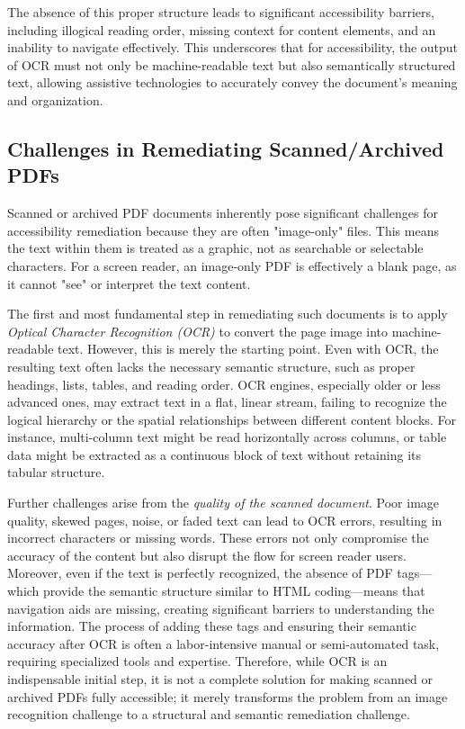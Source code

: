 The absence of this proper structure leads to significant accessibility barriers, including illogical reading order, missing context for content elements, and an inability to navigate effectively. \cite{UWDocInfo,DevToPDFStructure} This underscores that for accessibility, the output of OCR must not only be machine-readable text but also semantically structured text, allowing assistive technologies to accurately convey the document's meaning and organization.

\subsection{Challenges in Remediating Scanned/Archived PDFs}

Scanned or archived PDF documents inherently pose significant challenges for accessibility remediation because they are often "image-only" files. This means the text within them is treated as a graphic, not as searchable or selectable characters. \cite{AdobeOCR, AWSOCR, UWDocInfo} For a screen reader, an image-only PDF is effectively a blank page, as it cannot "see" or interpret the text content.

The first and most fundamental step in remediating such documents is to apply \emph{Optical Character Recognition (OCR)} to convert the page image into machine-readable text. \cite{UWDocInfo} However, this is merely the starting point. Even with OCR, the resulting text often lacks the necessary semantic structure, such as proper headings, lists, tables, and reading order. \cite{UWDocInfo} OCR engines, especially older or less advanced ones, may extract text in a flat, linear stream, failing to recognize the logical hierarchy or the spatial relationships between different content blocks. For instance, multi-column text might be read horizontally across columns, or table data might be extracted as a continuous block of text without retaining its tabular structure. \cite{UWDocInfo}

Further challenges arise from the \emph{quality of the scanned document}. Poor image quality, skewed pages, noise, or faded text can lead to OCR errors, resulting in incorrect characters or missing words. \cite{DocuclipperLimitations} \cite{DigitalDefyndOCR} These errors not only compromise the accuracy of the content but also disrupt the flow for screen reader users. Moreover, even if the text is perfectly recognized, the absence of PDF tags—which provide the semantic structure similar to HTML coding—means that navigation aids are missing, creating significant barriers to understanding the information. \cite{UWDocInfo} The process of adding these tags and ensuring their semantic accuracy after OCR is often a labor-intensive manual or semi-automated task, requiring specialized tools and expertise. Therefore, while OCR is an indispensable initial step, it is not a complete solution for making scanned or archived PDFs fully accessible; it merely transforms the problem from an image recognition challenge to a structural and semantic remediation challenge.

